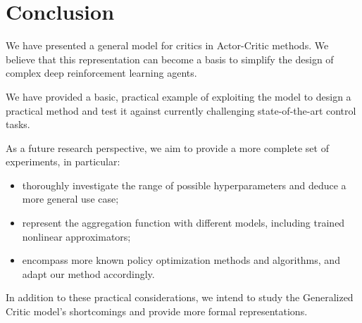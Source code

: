 \section{Conclusion}
\label{sec:conc}
We have presented a general model for critics in Actor-Critic methods. We believe that this representation can become a basis to simplify the design of complex deep reinforcement learning agents.

We have provided a basic, practical example of exploiting the model to design a practical method and test it against currently challenging state-of-the-art control tasks.

As a future research perspective, we aim to provide a more complete set of experiments, in particular: 
\begin{itemize}
\item thoroughly investigate the range of possible hyperparameters and deduce a more general use case;
\item represent the aggregation function with different models, including trained nonlinear approximators;
\item encompass more known policy optimization methods and algorithms, and adapt our method accordingly.
\end{itemize}

In addition to these practical considerations, we intend to study the Generalized Critic model's shortcomings and provide more formal representations.




